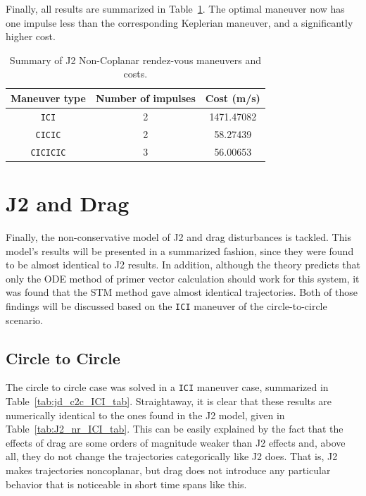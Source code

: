 Finally, all results are summarized in Table~\ref{tab:J2_nr_summary}. The optimal maneuver now has one impulse less than the corresponding Keplerian maneuver, and a significantly higher cost.

\begin{table}[htbp]
    \centering
    \begin{tabular}{ccc} \toprule
        Maneuver type & Number of impulses & Cost (m/s) \\ \midrule
        \texttt{ICI} & 2 & 1471.47082 \\
        \texttt{CICIC} & 2 & 58.27439 \\
        \texttt{CICICIC} & 3 & 56.00653 \\\bottomrule
    \end{tabular}
    \caption{Summary of J2 Non-Coplanar rendez-vous maneuvers and costs.}
    \label{tab:J2_nr_summary}
\end{table}

\newpage
\FloatBarrier
\section{J2 and Drag}

Finally, the non-conservative model of J2 and drag disturbances is tackled. This model's results will be presented in a summarized fashion, since they were found to be almost identical to J2 results. In addition, although the theory predicts that only the ODE method of primer vector calculation should work for this system, it was found that the STM method gave almost identical trajectories. Both of those findings will be discussed based on the \texttt{ICI} maneuver of the circle-to-circle scenario.

\subsection{Circle to Circle}

The circle to circle case was solved in a \texttt{ICI} maneuver case, summarized in Table~\ref{tab:jd_c2c_ICI_tab}. Straightaway, it is clear that these results are numerically identical to the ones found in the J2 model, given in Table~\ref{tab:J2_nr_ICI_tab}. This can be easily explained by the fact that the effects of drag are some orders of magnitude weaker than J2 effects and, above all, they do not change the trajectories categorically like J2 does. That is, J2 makes trajectories noncoplanar, but drag does not introduce any particular behavior that is noticeable in short time spans like this.
    
